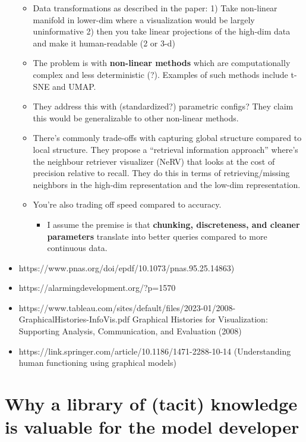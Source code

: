 \documentclass[
]{article}
\providecommand{\tightlist}{%
  \setlength{\itemsep}{0pt}\setlength{\parskip}{0pt}}\usepackage{longtable,booktabs,array}
\begin{document}
\begin{itemize}
  \begin{itemize}
  \item
    Data transformations as described in the paper: 1) Take non-linear
    manifold in lower-dim where a visualization would be largely
    uninformative 2) then you take linear projections of the high-dim
    data and make it human-readable (2 or 3-d)
  \item
    The problem is with \textbf{non-linear methods} which are
    computationally complex and less deterministic (?). Examples of such
    methods include t-SNE and UMAP.
  \item
    They address this with (standardized?) parametric configs? They
    claim this would be generalizable to other non-linear methods.
  \item
    There's commonly trade-offs with capturing global structure compared
    to local structure. They propose a ``retrieval information
    approach'' where's the neighbour retriever visualizer (NeRV) that
    looks at the cost of precision relative to recall. They do this in
    terms of retrieving/missing neighbors in the high-dim representation
    and the low-dim representation.
  \item
    You're also trading off speed compared to accuracy.

    \begin{itemize}
    \tightlist
    \item
      I assume the premise is that \textbf{chunking, discreteness, and
      cleaner parameters} translate into better queries compared to more
      continuous data.
    \end{itemize}
  \end{itemize}
\item
  https://www.pnas.org/doi/epdf/10.1073/pnas.95.25.14863)
\item
  https://alarmingdevelopment.org/?p=1570
\item
  https://www.tableau.com/sites/default/files/2023-01/2008-GraphicalHistories-InfoVis.pdf
  Graphical Histories for Visualization: Supporting Analysis,
  Communication, and Evaluation (2008)
\item
  https://link.springer.com/article/10.1186/1471-2288-10-14
  (Understanding human functioning using graphical models)
\end{itemize}

\section{Why a library of (tacit) knowledge is valuable for the model
developer}\label{why-a-library-of-tacit-knowledge-is-valuable-for-the-model-developer}
\end{document}
